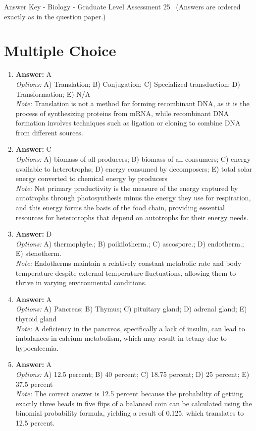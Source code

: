 \documentclass[12pt]{article}
\begin{document}
\begin{center}
Answer Key - Biology - Graduate Level Assessment 25 \
\small (Answers are ordered exactly as in the question paper.)
\end{center}

\section*{Multiple Choice}
\begin{enumerate}[label=\arabic*.]
\item \textbf{Answer:} A
\\ \textit{Options:} A) Translation; B) Conjugation; C) Specialized transduction; D) Transformation; E) N/A
\\ \textit{Note:} Translation is not a method for forming recombinant DNA, as it is the process of synthesizing proteins from mRNA, while recombinant DNA formation involves techniques such as ligation or cloning to combine DNA from different sources.
\item \textbf{Answer:} C
\\ \textit{Options:} A) biomass of all producers; B) biomass of all consumers; C) energy available to heterotrophs; D) energy consumed by decomposers; E) total solar energy converted to chemical energy by producers
\\ \textit{Note:} Net primary productivity is the measure of the energy captured by autotrophs through photosynthesis minus the energy they use for respiration, and this energy forms the basis of the food chain, providing essential resources for heterotrophs that depend on autotrophs for their energy needs.
\item \textbf{Answer:} D
\\ \textit{Options:} A) thermophyle.; B) poikilotherm.; C) ascospore.; D) endotherm.; E) stenotherm.
\\ \textit{Note:} Endotherms maintain a relatively constant metabolic rate and body temperature despite external temperature fluctuations, allowing them to thrive in varying environmental conditions.
\item \textbf{Answer:} A
\\ \textit{Options:} A) Pancreas; B) Thymus; C) pituitary gland; D) adrenal gland; E) thyroid gland
\\ \textit{Note:} A deficiency in the pancreas, specifically a lack of insulin, can lead to imbalances in calcium metabolism, which may result in tetany due to hypocalcemia.
\item \textbf{Answer:} A
\\ \textit{Options:} A) 12.5 percent; B) 40 percent; C) 18.75 percent; D) 25 percent; E) 37.5 percent
\\ \textit{Note:} The correct answer is 12.5 percent because the probability of getting exactly three heads in five flips of a balanced coin can be calculated using the binomial probability formula, yielding a result of 0.125, which translates to 12.5 percent.
\end{enumerate}
\end{document}
